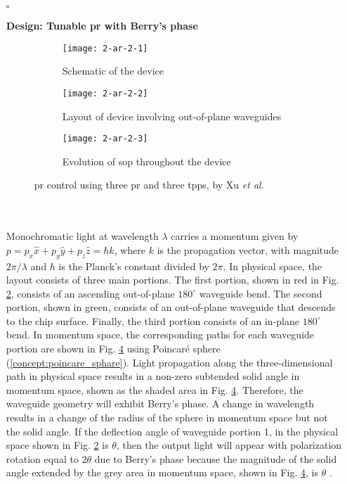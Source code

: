 \documentclass[../report.tex]{subfiles}
\begin{document}
	\begin{itemize}[leftmargin=*]
		
		\item[$\square$]\begin{minipage}[t]{\textwidth}\textbf{Design: Tunable \gls{pr} with Berry's phase}
			\begin{figure}[H] %
				\begin{subfigure}[t]{0.33\textwidth}
					\texttt{[image: 2-ar-2-1]}
					\caption{Schematic of the device}
					\label{fig:2_ar_2_1}
				\end{subfigure}
				\hfill
				\begin{subfigure}[t]{0.33\textwidth}
					\texttt{[image: 2-ar-2-2]}
					\caption{Layout of device involving out-of-plane waveguides}
					\label{fig:2_ar_2_2}
				\end{subfigure}
				\hfill
				\begin{subfigure}[t]{0.27\textwidth}
					\texttt{[image: 2-ar-2-3]}
					\caption{Evolution of \gls{sop} throughout the device}
					\label{fig:2_ar_2_3}
				\end{subfigure}
				\caption{\gls{pr} control using three \gls{pr} and three \gls{tpps}, by Xu \textit{et al.} \cite{xu_electrically_2014}}
			\end{figure}
		\end{minipage}\\\\
		\noindent Monochromatic light at wavelength $\lambda$ carries a momentum given by $p = p_{x}\widehat {x}+p_{y}\widehat {y}+p_{z}\widehat {z} = \hbar k$, where $k$ is the propagation vector, with magnitude $2\pi/\lambda$ and $\hbar$ is the Planck’s constant divided by $2\pi$. In physical space, the layout consists of three main portions. The first portion, shown in red in Fig. \ref{fig:2_ar_2_2}, consists of an ascending out-of-plane $180^{\circ}$ waveguide bend. The second portion, shown in green, consists of an out-of-plane waveguide that descends to the chip surface. Finally, the third portion consists of an in-plane $180^{\circ}$ bend. In momentum space, the corresponding paths for each waveguide portion are shown in Fig. \ref{fig:2_ar_2_3} using Poincaré sphere (\ref{concept:poincare_sphare}). Light propagation along the three-dimensional path in physical space results in a non-zero subtended solid angle in momentum space, shown as the shaded area in Fig. \ref{fig:2_ar_2_3}. Therefore, the waveguide geometry will exhibit Berry’s phase. A change in wavelength results in a change of the radius of the sphere in momentum space but not the solid angle. If the deflection angle of waveguide portion 1, in the physical space shown in Fig. \ref{fig:2_ar_2_2} is $\theta$, then the output light will appear with polarization rotation equal to $2\theta$ due to Berry’s phase because the magnitude of the solid angle extended by the grey area in momentum space, shown in Fig. \ref{fig:2_ar_2_3}, is $\theta$ \cite{xu_electrically_2014}.
		

\end{itemize}
\end{document}
